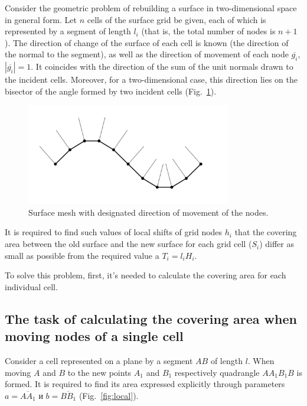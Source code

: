 \documentclass[
11pt,%
tightenlines,%
twoside,%
onecolumn,%
nofloats,%
nobibnotes,%
nofootinbib,%
superscriptaddress,%
noshowpacs,%
centertags]%
{revtex4}
\begin{document}
Consider the geometric problem of rebuilding a surface in two-dimensional space in general form.
Let $n$ cells of the surface grid be given, each of which is represented by a segment of length $l_i$ (that is, the total number of nodes is $n+1$).
The direction of change of the surface of each cell is known (the direction of the normal to the segment), as well as the direction of movement of each node $\overline{g_i}$, $|\overline{g_i}| = 1$.
It coincides with the direction of the sum of the unit normals drawn to the incident cells.
Moreover, for a two-dimensional case, this direction lies on the bisector of the angle formed by two incident cells \cite{Fortin} (Fig.~\ref{fig:grid_normals}).

\begin{figure}[h]
\setcaptionmargin{5mm}
\onelinecaptionstrue
\includegraphics[width=0.8\textwidth]{pics/grid_normals.pdf}
\caption{Surface mesh with designated direction of movement of the nodes.}
\label{fig:grid_normals}
\end{figure}

It is required to find such values of local shifts of grid nodes $h_i$ that the covering area between the old surface and the new surface for each grid cell ($S_i$) differ as small as possible from the required value a $T_i = l_iH_i$.

To solve this problem, first, it's needed to calculate the covering area for each individual cell.

\subsection{The task of calculating the covering area when moving nodes of a single cell}

Consider a cell represented on a plane by a segment $AB$ of length $l$.
When moving $A$ and $B$ to the new points $A_1$ and $B_1$ respectively quadrangle $AA_1B_1B$ is formed.
It is required to find its area expressed explicitly through parameters $a = \overline{AA_1}$ и $b = \overline{BB_1}$ (Fig.~\ref{fig:local}).
\end{document}
